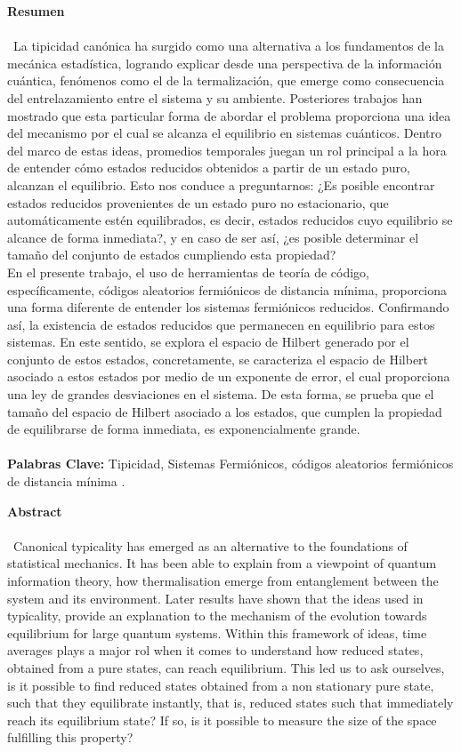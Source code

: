 \textbf{\LARGE Resumen}\\\\
\
La tipicidad canónica ha surgido como una alternativa a los fundamentos de la mecánica estadística, logrando explicar desde una perspectiva de la información cuántica, fenómenos como el de la termalización, que emerge como consecuencia del entrelazamiento entre el sistema y su ambiente.  Posteriores trabajos han mostrado que esta particular forma de abordar el problema proporciona una idea del mecanismo por el cual se alcanza el equilibrio en sistemas cuánticos. Dentro del marco de estas ideas, promedios temporales juegan un rol principal a la hora de entender cómo estados reducidos obtenidos a partir de un estado puro, alcanzan el equilibrio. Esto nos conduce a preguntarnos: ¿Es posible encontrar estados reducidos provenientes de un estado puro no estacionario, que automáticamente estén equilibrados, es decir, estados reducidos cuyo equilibrio se alcance de forma inmediata?, y en caso de ser así, ¿es posible determinar el tamaño del conjunto de estados cumpliendo esta propiedad?\\
\indent En el presente trabajo, el uso de herramientas de teoría de código, específicamente, códigos aleatorios fermiónicos de distancia mínima, proporciona una forma diferente de entender los sistemas fermiónicos reducidos. Confirmando así, la  existencia de estados reducidos que permanecen en equilibrio para estos sistemas. En este sentido, se explora el espacio de Hilbert generado por el conjunto de estos estados, concretamente, se caracteriza el espacio de Hilbert asociado a estos estados por medio de un exponente de error, el cual proporciona una ley de grandes desviaciones en el sistema. De esta forma, se prueba que el tamaño del espacio de Hilbert asociado a los estados, que cumplen la propiedad de equilibrarse de forma inmediata, es exponencialmente grande.\\\\
\textbf{\small Palabras Clave:} Tipicidad, Sistemas Fermiónicos, códigos aleatorios fermiónicos de distancia mínima .
\newpage{}
\textbf{\LARGE Abstract}\\\\
\
Canonical typicality has emerged as an alternative to the foundations of statistical mechanics. It has been able to explain from a viewpoint of quantum information theory, how thermalisation emerge from entanglement between the system and its environment. Later results have shown that the ideas used in typicality, provide an explanation to the mechanism of the evolution towards equilibrium for large quantum systems. Within this framework of ideas, time averages plays a major rol when it comes to understand how reduced states, obtained from a pure states, can reach equilibrium. This led us to ask ourselves, is it possible to find reduced states obtained from a non stationary pure state, such that they equilibrate instantly, that is, reduced states such that immediately reach its equilibrium state? If so, is it possible to measure the size of the space fulfilling this property? \\
